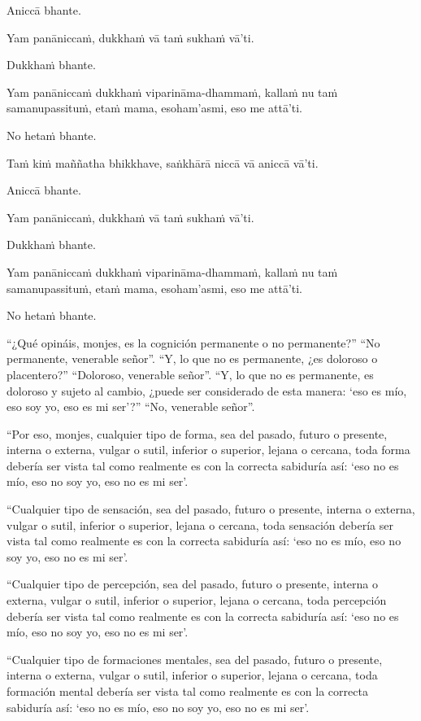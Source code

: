 Aniccā bhante.

Yam panāniccaṁ, dukkhaṁ vā taṁ sukhaṁ vā'ti.

Dukkhaṁ bhante.

Yam panāniccaṁ dukkhaṁ viparināma-dhammaṁ, kallaṁ nu taṁ samanupassituṁ,
etaṁ mama, esoham'asmi, eso me attā'ti.

No hetaṁ bhante.

Taṁ kiṁ maññatha bhikkhave, saṅkhārā niccā vā aniccā vā'ti.

Aniccā bhante.

Yam panāniccaṁ, dukkhaṁ vā taṁ sukhaṁ vā'ti.

Dukkhaṁ bhante.

Yam panāniccaṁ dukkhaṁ viparināma-dhammaṁ, kallaṁ nu taṁ samanupassituṁ,
etaṁ mama, esoham'asmi, eso me attā'ti.

No hetaṁ bhante.

\clearpage

\englishText
\markboth{\englishTitle}{\rightmark}

“¿Qué opináis, monjes, es la cognición permanente o no permanente?”
“No permanente, venerable señor”.
“Y, lo que no es permanente, ¿es doloroso o placentero?”
“Doloroso, venerable señor”.
“Y, lo que no es permanente, es doloroso y sujeto al cambio, ¿puede ser considerado de esta manera: ‘eso es mío, eso soy yo, eso es mi ser’?”
“No, venerable señor”.

“Por eso, monjes, cualquier tipo de forma, sea del pasado, futuro o presente, interna o externa, vulgar o sutil, inferior o superior, lejana o cercana, toda forma debería ser vista tal como realmente es con la correcta sabiduría así: ‘eso no es mío, eso no soy yo, eso no es mi ser’.

“Cualquier tipo de sensación, sea del pasado, futuro o presente, interna o externa, vulgar o sutil, inferior o superior, lejana o cercana, toda sensación debería ser vista tal como realmente es con la correcta sabiduría así: ‘eso no es mío, eso no soy yo, eso no es mi ser’.

“Cualquier tipo de percepción, sea del pasado, futuro o presente, interna o externa, vulgar o sutil, inferior o superior, lejana o cercana, toda percepción debería ser vista tal como realmente es con la correcta sabiduría así: ‘eso no es mío, eso no soy yo, eso no es mi ser’.

“Cualquier tipo de formaciones mentales, sea del pasado, futuro o presente, interna o externa, vulgar o sutil, inferior o superior, lejana o cercana, toda formación mental debería ser vista tal como realmente es con la correcta sabiduría así: ‘eso no es mío, eso no soy yo, eso no es mi ser’.



